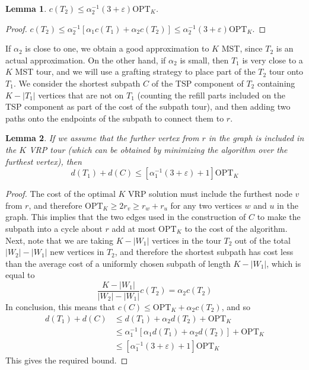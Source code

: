 \documentclass{article}
\theoremstyle{plain}
\newtheorem{lemma}{Lemma}
\begin{document}
\begin{lemma}
    $c(T_2) \leq \alpha_2^{-1}(3 + \varepsilon) \text{OPT}_K$.
\end{lemma}
\begin{proof}
    $c(T_2) \leq \alpha_2^{-1}[\alpha_1 c(T_1) + \alpha_2 c(T_2)] \leq \alpha_2^{-1} (3 + \varepsilon) \text{OPT}_K$.
\end{proof}

If $\alpha_2$ is close to one, we obtain a good approximation to $K$ MST, since $T_2$ is an actual approximation. On the other hand, if $\alpha_2$ is small, then $T_1$ is very close to a $K$ MST tour, and we will use a grafting strategy to place part of the $T_2$ tour onto $T_1$. We consider the shortest subpath $C$ of the TSP component of $T_2$ containing $K - |T_1|$ vertices that are not on $T_1$ (counting the refill parts included on the TSP component as part of the cost of the subpath tour), and then adding two paths onto the endpoints of the subpath to connect them to $r$.

\begin{lemma}
    If we assume that the further vertex from $r$ in the graph is included in the $K$ VRP tour (which can be obtained by minimizing the algorithm over the furthest vertex), then
    \[ d(T_1) + d(C) \leq [\alpha_1^{-1} (3 + \varepsilon) + 1] \text{OPT}_K \]
\end{lemma}
\begin{proof}
    The cost of the optimal $K$ VRP solution must include the furthest node $v$ from $r$, and therefore $\text{OPT}_K \geq 2r_v \geq r_w + r_u$ for any two vertices $w$ and $u$ in the graph. This implies that the two edges used in the construction of $C$ to make the subpath into a cycle about $r$ add at most $\text{OPT}_K$ to the cost of the algorithm. Next, note that we are taking $K - |W_1|$ vertices in the tour $T_2$ out of the total $|W_2| - |W_1|$ new vertices in $T_2$, and therefore the shortest subpath has cost less than the average cost of a uniformly chosen subpath of length $K - |W_1|$, which is equal to
    \[ \frac{K - |W_1|}{|W_2| - |W_1|} c(T_2) = \alpha_2 c(T_2) \]
    In conclusion, this means that $c(C) \leq \text{OPT}_K + \alpha_2 c(T_2)$, and so
    \begin{align*}
        d(T_1) + d(C) &\leq d(T_1) + \alpha_2 d(T_2) + \text{OPT}_K\\
        &\leq \alpha_1^{-1}[\alpha_1 d(T_1) + \alpha_2 d(T_2)] + \text{OPT}_K\\
        &\leq [\alpha_1^{-1} (3 + \varepsilon) + 1] \text{OPT}_K
    \end{align*}
    This gives the required bound.
\end{proof}
\end{document}
